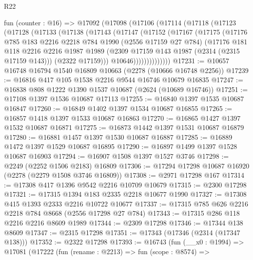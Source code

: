 \begin{lexlean}{R22}
\begin{coremodule}
    fun (counter : @16) =>
    @17092
      (@17098
        (@17106
          (@17114
            (@17118
              (@17123
                (@17128
                  (@17133
                    (@17138
                      (@17143
                        (@17147
                          (@17152
                            (@17167
                              (@17175
                                (@17176
                                  @785
                                  @183
                                  @2216
                                  @2218
                                  @784
                                  @1990
                                  (@2556 @17159 @27 @784)
                                  (@17176
                                    @181
                                    @118
                                    @2216
                                    @2216
                                    @1987
                                    @1989
                                    (@2309 @17159 @143 @1987 (@2314 (@2315 @17159 @143)))
                                    (@2322 @17159)))
                                @10646))))))))))))))
@17231 := @10657 @16748 @16794 @1540 @16809 @10663 (@2278 (@10666 @16748 @2256))
@17239 := @16816 @417 @105 @1538 @2216 @9544 @16746 @10679 @16835
@17247 := @16838 @808 @1222 @1390 @1537 @10687 (@2624 (@10689 @16746))
@17251 := @17108 @1397 @1536 @10687 @17113
@17255 := @16840 @1397 @1535 @10687 @16847
@17260 := @16849 @1402 @1397 @1534 @10687 @16855
@17265 := @16857 @1418 @1397 @1533 @10687 @16863
@17270 := @16865 @1427 @1397 @1532 @10687 @16871
@17275 := @16873 @1442 @1397 @1531 @10687 @16879
@17280 := @16881 @1457 @1397 @1530 @10687 @16887
@17285 := @16889 @1472 @1397 @1529 @10687 @16895
@17290 := @16897 @1499 @1397 @1528 @10687 @16903
@17294 := @16907 @1508 @1397 @1527 @3746
@17298 := @2249 (@2252 @1506 @2183) @16809
@17306 := @17294 @17298 @10687 @16920 (@2278 (@2279 @1508 @3746 @16809))
@17308 := @2971 @17298 @167
@17314 := @17308 @417 @1396 @9542 @2216 @10709 @10679
@17315 := @2300 @17298
@17321 := @17315 @1394 @183 @2335 @2218 @10677 @1990
@17327 := @17308 @415 @1393 @2333 @2216 @10722 @10677
@17337 := @17315 @785 @626 @2216 @2218 @784 @8668 (@2556 @17298 @27 @784)
@17343 := @17315 @286 @118 @2216 @2216 @8609 @1989
@17344 := @2309 @17298
@17346 := @17344 @138 @8609
@17347 := @2315 @17298
@17351 := @17343 (@17346 (@2314 (@17347 @138)))
@17352 := @2322 @17298
@17393 := @16743
    (fun (__x0 : @1994) =>
    @17081
      (@17222
        (fun (rename : @2213) =>
        fun (scope : @8574) =>

\end{coremodule}
\end{lexlean}
